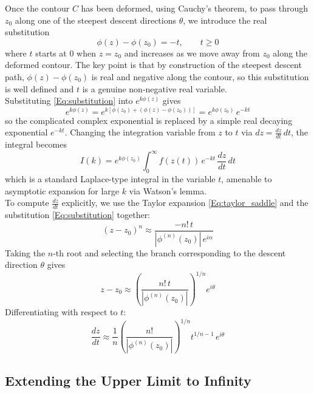 Once the contour $C$ has been deformed, using Cauchy's theorem, to pass through $z_0$ along one of the steepest descent directions $\theta$, we introduce the real substitution
\begin{equation}\label{Eq:substitution}
    \phi(z) - \phi(z_0) = -t, \qquad t \geq 0
\end{equation}where $t$ starts at $0$ when $z = z_0$ and increases as we move away from $z_0$ along the deformed contour. The key point is that by construction of the steepest descent path, $\phi(z) - \phi(z_0)$ is real and negative along the contour, so this substitution is well defined and $t$ is a genuine non-negative real variable.
\\
Substituting \eqref{Eq:substitution} into $e^{k\phi(z)}$ gives$$e^{k\phi(z)} = e^{k[\phi(z_0) + (\phi(z) - \phi(z_0))]} = e^{k\phi(z_0)}\,e^{-kt}$$so the complicated complex exponential is replaced by a simple real decaying exponential $e^{-kt}$. Changing the integration variable from $z$ to $t$ via $dz = \frac{dz}{dt}\,dt$, the integral becomes
\begin{equation}\label{Eq:laplace_form}
    I(k) = e^{k\phi(z_0)}\int_0^\infty f(z(t))\,e^{-kt}\,\frac{dz}{dt}\,dt
\end{equation}
which is a standard Laplace-type integral in the variable $t$, amenable to asymptotic expansion for large $k$ via Watson's lemma. \cite{olver1997,Steepestdescent}
\\
To compute $\frac{dz}{dt}$ explicitly, we use the Taylor expansion \eqref{Eq:taylor_saddle} and the substitution \eqref{Eq:substitution} together:$$(z-z_0)^n \approx \frac{-n!\,t}{|\phi^{(n)}(z_0)|\,e^{i\alpha}}$$Taking the $n$-th root and selecting the branch corresponding to the descent direction $\theta$ gives $$z - z_0 \approx \left(\frac{n!\,t}{|\phi^{(n)}(z_0)|}\right)^{1/n} e^{i\theta}$$ Differentiating with respect to $t$:
\begin{equation}\label{Eq:jacobian}
    \frac{dz}{dt} \approx \frac{1}{n}\left(\frac{n!}{|\phi^{(n)}(z_0)|}
    \right)^{1/n} t^{1/n - 1}\,e^{i\theta}
\end{equation}

\subsection{Extending the Upper Limit to Infinity}

